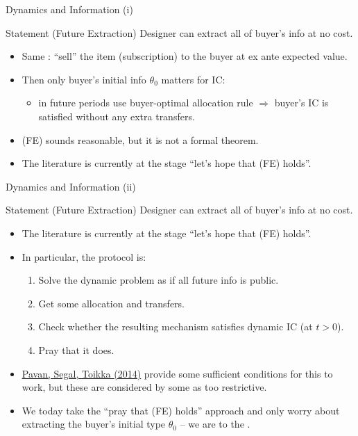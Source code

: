 \documentclass[english,10pt
,aspectratio=169
]{beamer}
\begin{document}
\begin{frame}{Dynamics and Information (i)}
	\begin{block}{Statement (Future Extraction)}
		Designer can extract all of buyer's  info at no cost.
	\end{block}
	\begin{minipage}[c][0.55\textheight][s]{\textwidth}
	\begin{itemize}
		\item Same : ``sell'' the item (subscription) to the buyer at ex ante expected value.
		\item Then only buyer's \alert{initial} info $\theta_0$ matters for IC:
		\begin{itemize}
			\item in future periods use buyer-optimal allocation rule $\Rightarrow$ buyer's IC is satisfied without any extra transfers.
		\end{itemize}
		\item (FE) sounds reasonable, but it is not a formal theorem.
		\item The literature is currently at the stage ``let's hope that (FE) holds''. 
	\end{itemize}
	\end{minipage}
\end{frame}


\begin{frame}{Dynamics and Information (ii)}
	\begin{block}{Statement (Future Extraction)}
		Designer can extract all of buyer's  info at no cost.
	\end{block}
	\begin{minipage}[c][0.55\textheight][s]{\textwidth}
		\begin{itemize}
			\item The literature is currently at the stage ``let's hope that (FE) holds''. 
			\item In particular, the protocol is:
			\begin{enumerate}
				\item Solve the dynamic problem \alert{as if} all future info is \alert{public}.
				\item Get some allocation and transfers.
				\item Check whether the resulting mechanism satisfies dynamic IC (at $t>0$).
				\item Pray that it does.
			\end{enumerate}
			\item \href{https://doi.org/10.3982/ECTA10269}{\uline{Pavan, Segal, Toikka (2014)}} provide some sufficient conditions for this to work, but these are considered by some as too restrictive.
			\item We today take the ``pray that (FE) holds'' approach and only worry about extracting the buyer's initial type $\theta_0$ -- we are  to the .
		\end{itemize}
	\end{minipage}
\end{frame}
\end{document}
